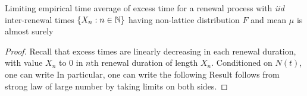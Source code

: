 \documentclass[a4paper,10pt,english]{article}
\begin{document}
\begin{lem}
Limiting empirical time average of excess time for a renewal process with \textit{iid} inter-renewal times $\{X_n: n \in \mathbb{N}\}$ having non-lattice distribution $F$ and mean $\mu$ is almost surely 
\end{lem}
\begin{proof}
Recall that excess times are linearly decreasing in each renewal duration, with value $X_n$ to $0$ in $n$th renewal duration of length $X_n$. 
Conditioned on $N(t)$, one can write 
In particular, one can write the following
Result follows from strong law of large number by taking limits on both sides. 
\end{proof}



\end{document}
